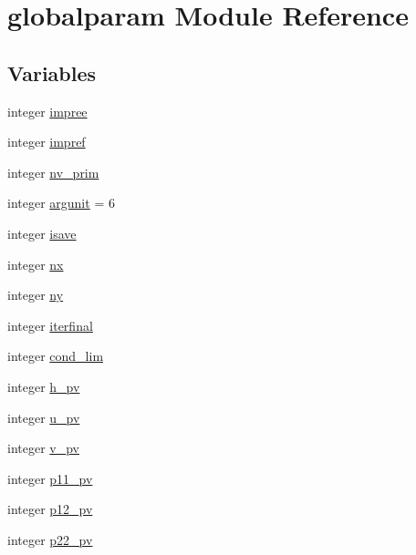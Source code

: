 \hypertarget{namespaceglobalparam}{}\section{globalparam Module Reference}
\label{namespaceglobalparam}
\subsection*{Variables}
\begin{DoxyCompactItemize}
\item 
integer \mbox{\hyperlink{namespaceglobalparam_a877f19a98e7a5d2d29ccb999f6a4b30b}{impree}}
\item 
integer \mbox{\hyperlink{namespaceglobalparam_ac4d90a4b214d99ef729a938064face25}{impref}}
\item 
integer \mbox{\hyperlink{namespaceglobalparam_a09fefe9eafe1d81a6be970794c775e36}{nv\+\_\+prim}}
\item 
integer \mbox{\hyperlink{namespaceglobalparam_a0f36e5940fffe44f73fbab54574ce74d}{argunit}} = 6
\item 
integer \mbox{\hyperlink{namespaceglobalparam_a41b8aacbc46aa9d8341860c8a0481a44}{isave}}
\item 
integer \mbox{\hyperlink{namespaceglobalparam_a3d0778a63b55337acd79aa06b9030ad0}{nx}}
\item 
integer \mbox{\hyperlink{namespaceglobalparam_ae3e17c94b4a693ce99dc99ca85e3aba5}{ny}}
\item 
integer \mbox{\hyperlink{namespaceglobalparam_a823f2901e26e8ed4b22569b63173f812}{iterfinal}}
\item 
integer \mbox{\hyperlink{namespaceglobalparam_a0dfd817bc37d123c49006e2b980414c5}{cond\+\_\+lim}}
\item 
integer \mbox{\hyperlink{namespaceglobalparam_a46daf38606bdbc2d5b4a2864c28cae5e}{h\+\_\+pv}}
\item 
integer \mbox{\hyperlink{namespaceglobalparam_acbf50879a37a52fcc5fc5e0f06b209ba}{u\+\_\+pv}}
\item 
integer \mbox{\hyperlink{namespaceglobalparam_a980a183375fbe21d1ba02b3611dcc94d}{v\+\_\+pv}}
\item 
integer \mbox{\hyperlink{namespaceglobalparam_a454092edac459f96bb9045ced3f632bd}{p11\+\_\+pv}}
\item 
integer \mbox{\hyperlink{namespaceglobalparam_a9d0f6eb467ec66a6825d64e743f0fc36}{p12\+\_\+pv}}
\item 
integer \mbox{\hyperlink{namespaceglobalparam_a1c0b88f532e0bb8c21c4aa92a92405ca}{p22\+\_\+pv}}

\end{DoxyCompactItemize}
